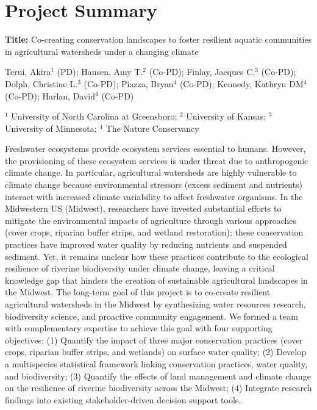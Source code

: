 \documentclass[12pt, class=article, crop=false]{standalone}
\begin{document}
\section*{Project Summary}

\textbf{Title:} Co-creating conservation landscapes to foster resilient aquatic communities in agricultural watersheds under a changing climate

Terui, Akira$^1$ (PD); Hansen, Amy T.$^2$ (Co-PD); Finlay, Jacques C.$^3$ (Co-PD); Dolph, Christine L.$^3$ (Co-PD); Piazza, Bryan$^4$ (Co-PD); Kennedy, Kathryn DM$^4$ (Co-PD); Harlan, David$^4$ (Co-PD)

$^1$ University of North Carolina at Greensboro;
$^2$ University of Kansas;
$^3$ University of Minnesota;
$^4$ The Nature Conservancy

Freshwater ecosystems provide ecosystem services essential to humans.
However, the provisioning of these ecosystem services is under threat due to anthropogenic climate change.
In particular, agricultural watersheds are highly vulnerable to climate change because environmental stressors (excess sediment and nutrients) interact with increased climate variability to affect freshwater organisms.
In the Midwestern US (Midwest), researchers have invested substantial efforts to mitigate the environmental impacts of agriculture through various approaches (cover crops, riparian buffer strips, and wetland restoration); these conservation practices have improved water quality by reducing nutrients and suspended sediment.
Yet, it remains unclear how these practices contribute to the ecological resilience of riverine biodiversity under climate change, leaving a critical knowledge gap that hinders the creation of sustainable agricultural landscapes in the Midwest.
The long-term goal of this project is to co-create resilient agricultural watersheds in the Midwest by synthesizing water resources research, biodiversity science, and proactive community engagement.
We formed a team with complementary expertise to achieve this goal with four supporting objectives: (1) Quantify
the impact of three major conservation practices (cover crops, riparian buffer strips, and wetlands) on surface water quality; (2) Develop a multispecies statistical framework linking conservation practices, water quality, and biodiversity; (3) Quantify the effects of land management and climate change on the resilience of riverine biodiversity across the Midwest; (4) Integrate research findings into existing stakeholder-driven decision support tools.
\end{document}
